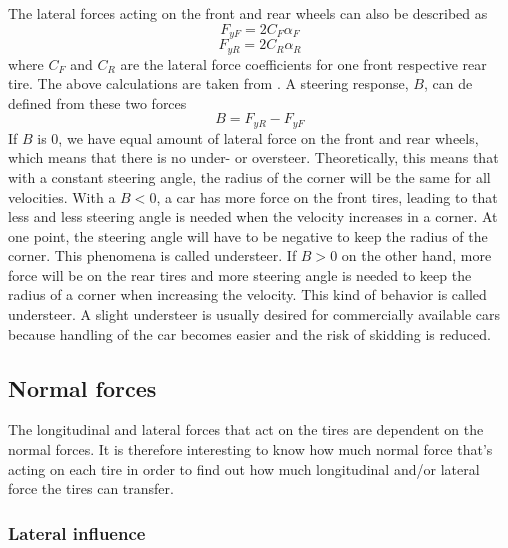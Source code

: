 The lateral forces acting on the front and rear wheels can also be described as 
\begin{equation}
	F_{yF} = 2C_{F}\alpha _{F}
\end{equation}
\begin{equation}
	F_{yR} = 2C_{R}\alpha _{R}
\end{equation}
where $ C_{F} $ and $ C_{R} $ are the lateral force coefficients for one front respective rear tire. The above calculations are taken from \cite{rajamani}. A steering response, $ B $, can de defined from these two forces \cite{fordonsdynamik99}
\begin{equation}
	B = F_{yR} - F_{yF}
\end{equation}
If $ B $ is 0, we have equal amount of lateral force on the front and rear wheels, which means that there is no under- or oversteer. Theoretically, this means that with a constant steering angle, the radius of the corner will be the same for all velocities. With a $ B < 0 $, a car has more force on the front tires, leading to that less and less steering angle is needed when the velocity increases in a corner. At one point, the steering angle will have to be negative to keep the radius of the corner. This phenomena is called understeer. If $ B > 0 $ on the other hand, more force will be on the rear tires and more steering angle is needed to keep the radius of a corner when increasing the velocity. This kind of behavior is called understeer. A slight understeer is usually desired for commercially available cars because handling of the car becomes easier and the risk of skidding is reduced.


\subsection{Normal forces}

The longitudinal and lateral forces that act on the tires are dependent on the normal forces. It is therefore interesting to know how much normal force that's acting on each tire in order to find out how much longitudinal and/or lateral force the tires can transfer.

\subsubsection{Lateral influence}

